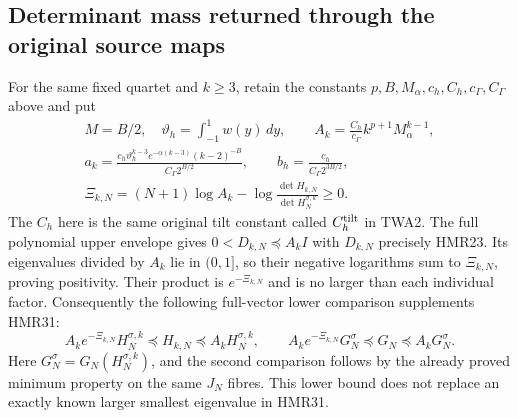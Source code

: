 \subsection{Determinant mass returned through the original source maps}

For the same fixed quartet and $k\geq3$, retain the constants
$p,B,M_\alpha,c_h,C_h,c_\Gamma,C_\Gamma$ above and put
\[
\begin{gathered}
 M=B/2,\quad \vartheta_h=\int_{-1}^1w(y)\,dy,\qquad
 A_k=\frac{C_h}{c_\Gamma}k^{p+1}M_\alpha^{k-1},\\
 a_k=\frac{c_h\vartheta_h^{k-3}e^{-\alpha(k-3)}(k-2)^{-B}}
                 {C_\Gamma2^{B/2}},\qquad
 b_h=\frac{c_h}{C_\Gamma2^{3B/2}},\\
 \Xi_{k,N}=(N+1)\log A_k
       -\log\frac{\det H_{k,N}}{\det H_N^{\sigma,k}}\geq0 .
\end{gathered}\tag{HMR36}
\]
The $C_h$ here is the same original tilt constant called
$C_h^{\rm tilt}$ in TWA2. The full polynomial upper envelope
gives $0<D_{k,N}\preceq A_kI$ with $D_{k,N}$ precisely HMR23.
Its eigenvalues divided by $A_k$ lie in $(0,1]$, so their
negative logarithms sum to $\Xi_{k,N}$, proving positivity.
Their product is $e^{-\Xi_{k,N}}$ and is no larger than each
individual factor. Consequently the following full-vector
lower comparison supplements HMR31:
\[
 A_ke^{-\Xi_{k,N}}H_N^{\sigma,k}
 \preceq H_{k,N}\preceq A_kH_N^{\sigma,k},\qquad
 A_ke^{-\Xi_{k,N}}G_N^\sigma
 \preceq G_N\preceq A_kG_N^\sigma .
 \tag{HMR37}
\]
Here $G_N^\sigma=G_N(H_N^{\sigma,k})$, and the second
comparison follows by the already proved minimum property
on the same $J_N$ fibres. This lower bound does not replace
an exactly known larger smallest eigenvalue in HMR31.

